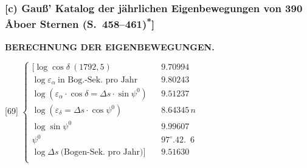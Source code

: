 \documentclass[12pt,a4paper]{article}
\theoremstyle{plain}
\theoremstyle{definition}
\theoremstyle{remark}
\begin{document}
\newpage
\subsubsection*{[c) Gau\ss' Katalog der j\"ahrlichen Eigenbewegungen von 390 \AA boer Sternen (S.~458--461)\textsuperscript{*}]}

\begin{center}
\textbf{BERECHNUNG DER EIGENBEWEGUNGEN.}
\end{center}

\begin{small}
\end{small}

\begin{small}
\begin{center}
[69] $\left\{\begin{array}{rcl}
[\log\cos\delta\ (1792{,}5) & & 9.70994 \\[2pt]
\log\varepsilon_{\alpha}\ \text{in Bog.-Sek.~pro Jahr} & & 9.80243 \\[2pt]
\log(\varepsilon_{\alpha}\cdot\cos\delta = \Delta s\cdot\sin\psi^{0}) & & 9.51237 \\[2pt]
\log(\varepsilon_{\delta} = \Delta s\cdot\cos\psi^{0}) & & 8.64345\,n \\[2pt]
\log\sin\psi^{0} & & 9.99607 \\[2pt]
\psi^{0} & & 97^{\circ}.42.\phantom{0}6 \\[2pt]
\log\Delta s\ \text{(Bogen-Sek.~pro Jahr)}] & & 9.51630 \\
\end{array}\right.$
\end{center}
\end{small}

\medskip
\begin{small}
\end{small}
\end{document}
